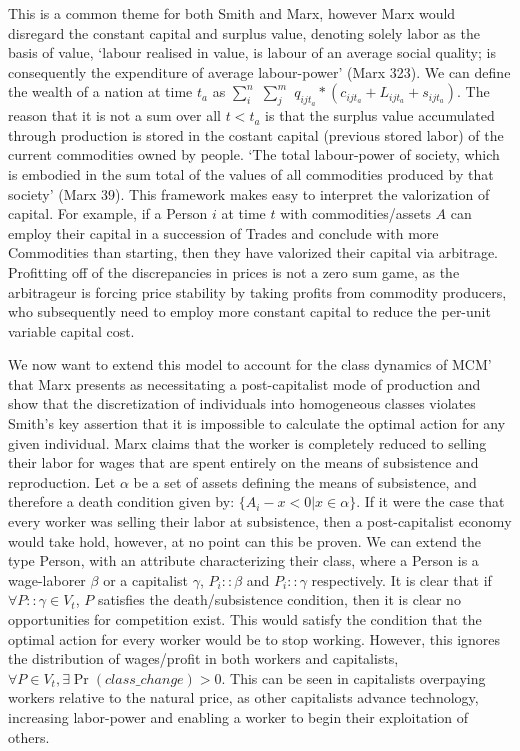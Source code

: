 \documentclass[12pt]{article}
\begin{document}
This is a common theme for both Smith and Marx, however Marx would disregard the constant capital and surplus value, denoting solely labor as the basis of value, `labour realised in value, is labour of an average social quality; is consequently the expenditure of average labour-power' (Marx 323).
We can define the wealth of a nation at time $t_a$ as $\sum\limits_i^n$ $\sum\limits_j^m$ $q_{ijt_{a}} * (c_{ijt_{a}} + L_{ijt_{a}} + s_{ijt_{a}})$. 
The reason that it is not a sum over all $t < t_a$ is that the surplus value accumulated through production is stored in the costant capital (previous stored labor) of the current commodities owned by people. `The total labour-power of society, which is embodied in the sum total of the values of all commodities produced by that society' (Marx 39).
This framework makes easy to interpret the valorization of capital.
For example, if a Person $i$ at time $t$ with commodities/assets $A$ can employ their capital in a succession of Trades and conclude with more Commodities than starting, then they have valorized their capital via arbitrage.
Profitting off of the discrepancies in prices is not a zero sum game, as the arbitrageur is forcing price stability by taking profits from commodity producers, who subsequently need to employ more constant capital to reduce the per-unit variable capital cost. \par

We now want to extend this model to account for the class dynamics of MCM' that Marx presents as necessitating a post-capitalist mode of production and show that the discretization of individuals into homogeneous classes violates Smith's key assertion that it is impossible to calculate the optimal action for any given individual.
Marx claims that the worker is completely reduced to selling their labor for wages that are spent entirely on the means of subsistence and reproduction. 
Let $\alpha$ be a set of assets defining the means of subsistence, and therefore a death condition given by: $\{A_i - x < 0| x \in \alpha \}$.
If it were the case that every worker was selling their labor at subsistence, then a post-capitalist economy would take hold, however, at no point can this be proven. 
We can extend the type Person, with an attribute characterizing their class, where a Person is a wage-laborer $\beta$ or a capitalist $\gamma$, $P_i::\beta$ and $P_i::\gamma$ respectively.
It is clear that if $\forall P::\gamma \in V_t$, $P$ satisfies the death/subsistence condition, then it is clear no opportunities for competition exist. 
This would satisfy the condition that the optimal action for every worker would be to stop working.
However, this ignores the distribution of wages/profit in both workers and capitalists, $\forall P \in V_t, \exists \Pr(class\_change) > 0$.
This can be seen in capitalists overpaying workers relative to the natural price, as other capitalists advance technology, increasing labor-power and enabling a worker to begin their exploitation of others. \par
\end{document}
